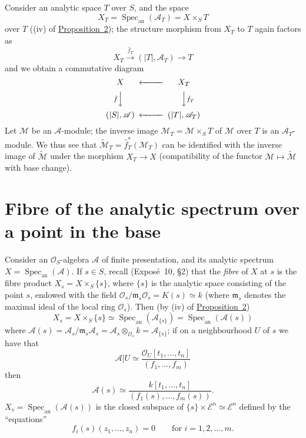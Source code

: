 \documentclass[british]{article}
\newcommand{\oldpage}[1]{\marginpar{\footnotesize$\Big\vert$ \textit{p.~#1}}}
\begin{document}
Consider an analytic space \(T\) over \(S\), and the space \[
  X_T
  = \operatorname{Spec}_\mathrm{an}({\mathscr{A}}_T)
  = X\times_S T
\] over \(T\) ((iv) of \hyperref[proposition-2]{Proposition~2}); the
structure morphism from \(X_T\) to \(T\) again factors as \[
  X_T
  \xrightarrow{\hat{f}_T}
  (|T|,{\mathscr{A}}_T)
  \to T
\] and we obtain a commutative diagram \[
  \begin{CD}
    X @<<< X_T
  \\@V{\hat{f}}VV @VV{\hat{f}_T}V
  \\(|S|,{\mathscr{A}}) @<<< (|T|,{\mathscr{A}}_T)
  \end{CD}
\] Let \({\mathscr{M}}\) be an \({\mathscr{A}}\)-module; the inverse
image \({\mathscr{M}}_T={\mathscr{M}}\times_S T\) of \({\mathscr{M}}\)
over \(T\) is an \({\mathscr{A}}_T\)-module. We thus see that
\(\widetilde{{\mathscr{M}}}_T=\hat{f}_T^*({\mathscr{M}}_T)\) can be
identified with the inverse image of \(\widetilde{{\mathscr{M}}}\) under
the morphism \(X_T\to X\) (compatibility of the functor
\({\mathscr{M}}\mapsto\widetilde{{\mathscr{M}}}\) with base change).

\section{Fibre of the analytic spectrum over a point in the
base}\label{section-2}

Consider an \({\mathscr{O}}_S\)-algebra \({\mathscr{A}}\) of finite
presentation, and its analytic spectrum
\(X=\operatorname{Spec}_\mathrm{an}({\mathscr{A}})\). If \(s\in S\),
recall (Exposé~10, §2) that the \emph{fibre} of \(X\) at \(s\) is the
fibre product \(X_s=X\times_S\{s\}\), where \(\{s\}\) is the analytic
space consisting of the point \(s\), endowed with the field
\({\mathscr{O}}_s/{\mathfrak{m}}_s{\mathscr{O}}_s=K(s)\simeq k\) (where
\({\mathfrak{m}}_s\) denotes the maximal ideal of the local ring
\({\mathscr{O}}_s\)). \oldpage{19-05} Then (by (iv) of
\hyperref[proposition-2]{Proposition~2}) \[
  X_s
  = X\times_S\{s\}
  \simeq \operatorname{Spec}_\mathrm{an}({\mathscr{A}}_{\{s\}})
  = \operatorname{Spec}_\mathrm{an}({\mathscr{A}}(s))
\] where
\({\mathscr{A}}(s)={\mathscr{A}}_s/{\mathfrak{m}}_s{\mathscr{A}}_s={\mathscr{A}}_s\otimes_{{\mathscr{O}}_s}k={\mathscr{A}}_{\{s\}}\);
if on a neighbourhood \(U\) of \(s\) we have that \[
  {\mathscr{A}}|U \simeq \frac{{\mathscr{O}}_U[t_1,\ldots,t_n]}{(f_1,\ldots,f_m)}
\] then \[
  {\mathscr{A}}(s) \simeq \frac{k[t_1,\ldots,t_n]}{(f_1(s),\ldots,f_m(s))}.
\] \(X_s=\operatorname{Spec}_\mathrm{an}({\mathscr{A}}(s))\) is the
closed subspace of \(\{s\}\times{\mathscr{E}}^n\simeq{\mathscr{E}}^n\)
defined by the ``equations'' \[
  f_i(s)(z_1,\ldots,z_n) = 0
  \qquad\text{for }i=1,2,\ldots,m.
\]
\end{document}
